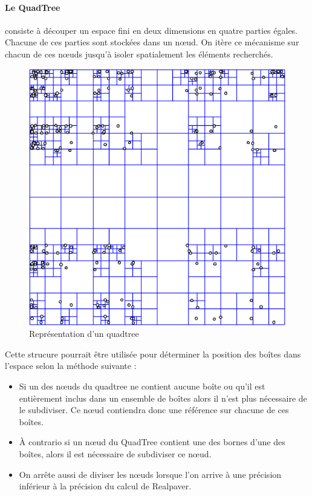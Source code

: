 \paragraph{Le QuadTree}consiste à découper un espace fini en deux dimensions en quatre parties égales. Chacune de ces parties sont stockées dans un nœud. On itère ce mécanisme sur chacun de ces nœuds jusqu'à isoler spatialement les éléments recherchés.
\begin{figure}[htbp]
\centering
\includegraphics[scale=0.50]{quadtree}
\caption{Représentation d'un quadtree}
\end{figure}
Cette strucure pourrait être utilisée pour déterminer la position des boîtes dans l'espace selon la méthode suivante :
\begin{itemize}
\item Si un des nœuds du quadtree ne contient aucune boîte ou qu'il est entièrement inclus dans un ensemble de boîtes alors il n'est plus nécessaire de le subdiviser. Ce nœud contiendra donc une référence sur chacune de ces boîtes.
\item \`A contrario si un nœud du QuadTree contient une des bornes d'une des boîtes, alors il est nécessaire de subdiviser ce nœud.
\item On arrête aussi de diviser les nœuds lorsque l'on arrive à une précision inférieur à la précision du calcul de Realpaver.
\end{itemize}

